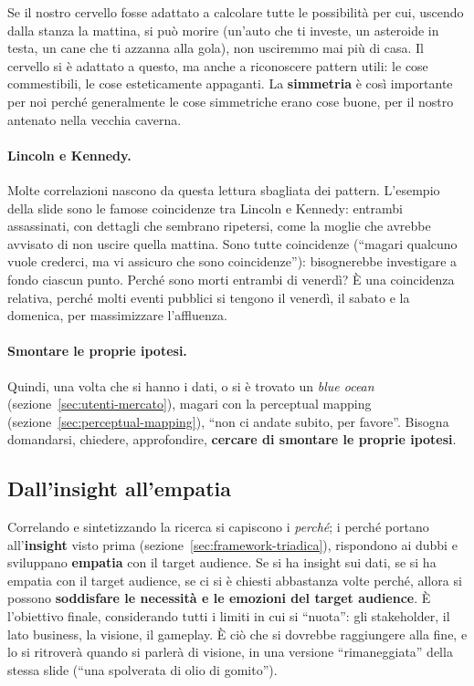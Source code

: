 Se il nostro cervello fosse adattato a calcolare tutte le possibilità per cui,
uscendo dalla stanza la mattina, si può morire (un'auto che ti investe, un
asteroide in testa, un cane che ti azzanna alla gola), non usciremmo mai più
di casa. Il cervello si è adattato a questo, ma anche a riconoscere pattern
utili: le cose commestibili, le cose esteticamente appaganti. La
\textbf{simmetria} è così importante per noi perché generalmente le cose
simmetriche erano cose buone, per il nostro antenato nella vecchia caverna.

\paragraph{Lincoln e Kennedy.} Molte correlazioni nascono da questa lettura
sbagliata dei pattern. L'esempio della slide sono le famose coincidenze tra
Lincoln e Kennedy: entrambi assassinati, con dettagli che sembrano
ripetersi, come la moglie che avrebbe avvisato di non uscire quella mattina.
Sono tutte coincidenze (``magari qualcuno vuole crederci, ma vi assicuro che
sono coincidenze''): bisognerebbe investigare a fondo ciascun punto. Perché
sono morti entrambi di venerdì? È una coincidenza relativa, perché molti
eventi pubblici si tengono il venerdì, il sabato e la domenica, per
massimizzare l'affluenza.

\paragraph{Smontare le proprie ipotesi.} Quindi, una volta che si hanno i
dati, o si è trovato un \emph{blue ocean} (sezione~\ref{sec:utenti-mercato}),
magari con la perceptual mapping (sezione~\ref{sec:perceptual-mapping}),
``non ci andate subito, per favore''. Bisogna domandarsi, chiedere,
approfondire, \textbf{cercare di smontare le proprie ipotesi}.

\subsection{Dall'insight all'empatia}

Correlando e sintetizzando la ricerca si capiscono i \emph{perché}; i perché
portano all'\textbf{insight} visto prima (sezione~\ref{sec:framework-triadica}),
rispondono ai dubbi e sviluppano \textbf{empatia} con il target audience. Se si
ha insight sui dati, se si ha empatia con il target audience, se ci si è
chiesti abbastanza volte perché, allora si possono \textbf{soddisfare le
necessità e le emozioni del target audience}. È l'obiettivo finale,
considerando tutti i limiti in cui si ``nuota'': gli stakeholder, il lato
business, la visione, il gameplay. È ciò che si dovrebbe raggiungere alla
fine, e lo si ritroverà quando si parlerà di visione, in una versione
``rimaneggiata'' della stessa slide (``una spolverata di olio di gomito'').

